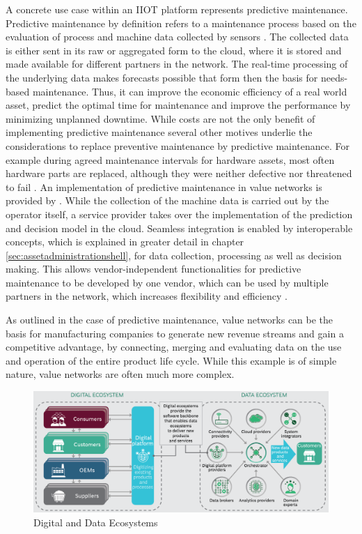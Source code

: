 A concrete use case within an \ac{IIOT} platform represents predictive maintenance. Predictive maintenance by definition refers to a maintenance process based on the evaluation of process and machine data collected by sensors \cite[p. 1670]{Selcuk2016PredictiveTrends:}. The collected data is either sent in its raw or aggregated form to the cloud, where it is stored and made available for different partners in the network. The real-time processing of the underlying data makes forecasts possible that form then the basis for needs-based maintenance. Thus, it can improve the economic efficiency of a real world asset, predict the optimal time for maintenance and improve the performance by minimizing unplanned downtime. While costs are not the only benefit of implementing predictive maintenance several other motives underlie the considerations to replace preventive maintenance by predictive maintenance. For example during agreed maintenance intervals for hardware assets, most often hardware parts are replaced, although they were neither defective nor threatened to fail \cite[p. 1672]{Selcuk2016PredictiveTrends:}. An implementation of predictive maintenance in value networks is provided by \citet[p. 11]{Cavalieri2020AShell}. While the collection of the machine data is carried out by the operator itself, a service provider takes over the implementation of the prediction and decision model in the cloud. Seamless integration is enabled by interoperable concepts, which is explained in greater detail in chapter \ref{sec:assetadministrationshell}, for data collection, processing as well as decision making. This allows vendor-independent functionalities for predictive maintenance to be developed by one vendor, which can be used by multiple partners in the network, which increases flexibility and efficiency \cite[p. 9]{Cavalieri2020AShell}.

As outlined in the case of predictive maintenance, value networks can be the basis for manufacturing companies to generate new revenue streams and gain a competitive advantage, by connecting, merging and evaluating data on the use and operation of the entire product life cycle. While this example is of simple nature, value networks are often much more complex.

\begin{figure}[h]
\includegraphics[scale=0.35]{content/pictures/digital_ecosystems_bcg.png}
\caption{Digital and Data Ecosystems}
\label{fig:valuenetworksi40}
\end{figure}

